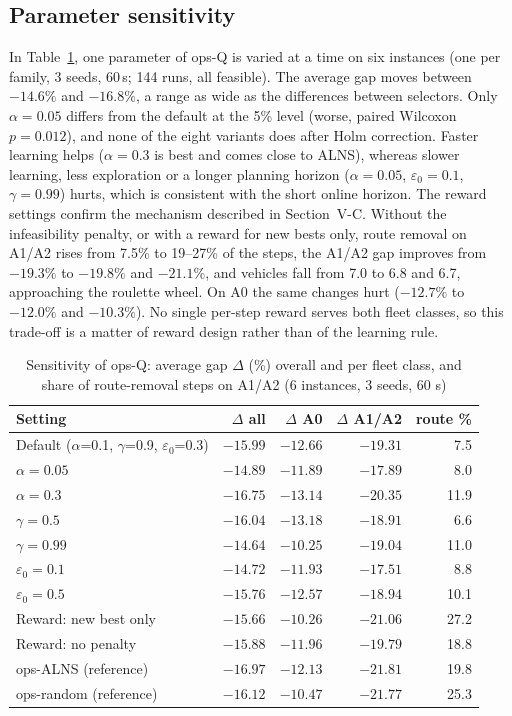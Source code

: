 \documentclass[conference]{IEEEtran}
\begin{document}
\subsection{Parameter sensitivity}
In Table~\ref{tab:sens}, one parameter of ops-Q is varied at a time on six instances (one per family, 3 seeds, 60\,s; 144 runs, all feasible). The average gap moves between $-14.6\%$ and $-16.8\%$, a range as wide as the differences between selectors. Only $\alpha=0.05$ differs from the default at the 5\% level (worse, paired Wilcoxon $p=0.012$), and none of the eight variants does after Holm correction. Faster learning helps ($\alpha=0.3$ is best and comes close to ALNS), whereas slower learning, less exploration or a longer planning horizon ($\alpha=0.05$, $\varepsilon_0=0.1$, $\gamma=0.99$) hurts, which is consistent with the short online horizon. The reward settings confirm the mechanism described in Section~V-C. Without the infeasibility penalty, or with a reward for new bests only, route removal on A1/A2 rises from 7.5\% to 19--27\% of the steps, the A1/A2 gap improves from $-19.3\%$ to $-19.8\%$ and $-21.1\%$, and vehicles fall from 7.0 to 6.8 and 6.7, approaching the roulette wheel. On A0 the same changes hurt ($-12.7\%$ to $-12.0\%$ and $-10.3\%$). No single per-step reward serves both fleet classes, so this trade-off is a matter of reward design rather than of the learning rule.

\begin{table}[t]
\caption{Sensitivity of ops-Q: average gap $\Delta$ (\%) overall and per fleet class, and share of route-removal steps on A1/A2 (6 instances, 3 seeds, 60 s)}\label{tab:sens}
\centering\setlength{\tabcolsep}{2.8pt}
\begin{tabular}{lrrrr}
\toprule
Setting & $\Delta$ all & $\Delta$ A0 & $\Delta$ A1/A2 & route \% \\
\midrule
Default ($\alpha$=0.1, $\gamma$=0.9, $\varepsilon_0$=0.3) & $-15.99$ & $-12.66$ & $-19.31$ & 7.5 \\
$\alpha=0.05$ & $-14.89$ & $-11.89$ & $-17.89$ & 8.0 \\
$\alpha=0.3$ & $\mathbf{-16.75}$ & $-13.14$ & $-20.35$ & 11.9 \\
$\gamma=0.5$ & $-16.04$ & $\mathbf{-13.18}$ & $-18.91$ & 6.6 \\
$\gamma=0.99$ & $-14.64$ & $-10.25$ & $-19.04$ & 11.0 \\
$\varepsilon_0=0.1$ & $-14.72$ & $-11.93$ & $-17.51$ & 8.8 \\
$\varepsilon_0=0.5$ & $-15.76$ & $-12.57$ & $-18.94$ & 10.1 \\
Reward: new best only & $-15.66$ & $-10.26$ & $\mathbf{-21.06}$ & 27.2 \\
Reward: no penalty & $-15.88$ & $-11.96$ & $-19.79$ & 18.8 \\
\midrule
ops-ALNS (reference) & $-16.97$ & $-12.13$ & $-21.81$ & 19.8 \\
ops-random (reference) & $-16.12$ & $-10.47$ & $-21.77$ & 25.3 \\
\bottomrule
\end{tabular}
\end{table}
\end{document}
